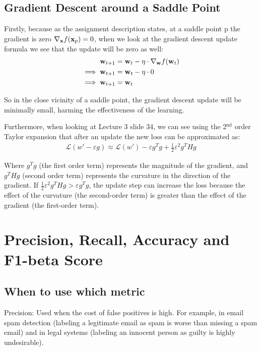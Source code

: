 \documentclass[a4paper]{article}
\begin{document}
\subsection{Gradient Descent around a Saddle Point}
Firstly, because as the assignment description states, at a saddle point p the gradient is zero
$\nabla_{\mathbf{x}} f(\mathbf{x}_p) = 0$, when we look at the gradient descent update formula we see that the update
will be zero as well:
\begin{align}
   \mathbf{w}_{t+1} &= \mathbf{w}_t - \eta \cdot \nabla_{\mathbf{w}} f(\mathbf{w}_t) \\
   \implies \mathbf{w}_{t+1} &= \mathbf{w}_t - \eta \cdot 0 \\
   \implies \mathbf{w}_{t+1} &= \mathbf{w}_t
\end{align}

So in the close vicinity of a saddle point, the gradient descent update will be minimally small, harming the
effectiveness of the learning.

Furthermore, when looking at Lecture 3 slide 34, we can see using the 2$^{\text{nd}}$ order Taylor expansion that
after an update the new loss can be approximated as:
\begin{align}
   \mathcal{L}(w' - \varepsilon g) \approx \mathcal{L}(w') - \varepsilon g^Tg + \frac{1}{2} \varepsilon^2 g^THg
\end{align}

Where $g^Tg$ (the first order term) represents the magnitude of the gradient, and $g^THg$ (second order term)
represents the curvature in the direction of the gradient.
If $\frac{1}{2} \varepsilon^2 g^THg > \varepsilon g^Tg$, the update step can increase the loss because the effect
of the curvature (the second-order term) is greater than the effect of the gradient (the first-order term).
\bigskip

\section{Precision, Recall, Accuracy and F1-beta Score}
\subsection{When to use which metric}
Precision: Used when the cost of false positives is high. For example, in email spam detection (labeling a
legitimate email as spam is worse than missing a spam email) and in legal systems (labeling an innocent person
as guilty is highly undesirable).
\end{document}
